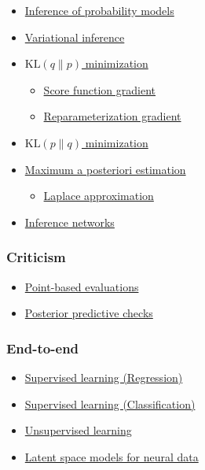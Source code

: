 \begin{itemize}
  \item \href{tut_inference}{Inference of probability models}
  \item \href{tut_variational_inference}{Variational inference}
  \item \href{tut_KLqp}{$\text{KL}(q\|p)$ minimization}
  \begin{itemize}
    \item \href{tut_KLqp_score}{Score function gradient}
    \item \href{tut_KLqp_reparam}{Reparameterization gradient}
  \end{itemize}
  \item \href{tut_KLpq}{$\text{KL}(p\|q)$ minimization}
  \item \href{tut_MAP}{Maximum a posteriori estimation}
  \begin{itemize}
    \item \href{tut_MAP_Laplace}{Laplace approximation}
  \end{itemize}
  \item \href{tut_inference_networks}{Inference networks}
\end{itemize}

\subsubsection{Criticism}

\begin{itemize}
  \item \href{tut_point_eval}{Point-based evaluations}
  \item \href{tut_PPC}{Posterior predictive checks}
\end{itemize}

\subsubsection{End-to-end}

\begin{itemize}
  \item \href{tut_supervised_regression}{Supervised learning (Regression)}
  \item \href{tut_supervised_classification}{Supervised learning (Classification)}
  \item \href{tut_unsupervised}{Unsupervised learning}
  \item \href{tut_latent_space_models}{Latent space models for neural data}
\end{itemize}
